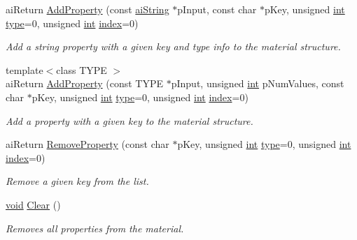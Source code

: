 \begin{DoxyCompactItemize}
ai\-Return \hyperlink{structai_material_a0432dbdfd97ffe71838daf967a6b087e}{Add\-Property} (const \hyperlink{structai_string}{ai\-String} $\ast$p\-Input, const char $\ast$p\-Key, unsigned \hyperlink{_s_d_l__thread_8h_a6a64f9be4433e4de6e2f2f548cf3c08e}{int} \hyperlink{_g_l_e_w_2glew_8h_a7d05960f4f1c1b11f3177dc963a45d86}{type}=0, unsigned \hyperlink{_s_d_l__thread_8h_a6a64f9be4433e4de6e2f2f548cf3c08e}{int} \hyperlink{_g_l_e_w_2glew_8h_a57f14e05b1900f16a2da82ade47d0c6d}{index}=0)
\begin{DoxyCompactList}\small\item\em Add a string property with a given key and type info to the material structure. \end{DoxyCompactList}\item 
{\footnotesize template$<$class T\-Y\-P\-E $>$ }\\ai\-Return \hyperlink{structai_material_a615a7af80f5d2b9f6f3ea66431017b4d}{Add\-Property} (const T\-Y\-P\-E $\ast$p\-Input, unsigned \hyperlink{_s_d_l__thread_8h_a6a64f9be4433e4de6e2f2f548cf3c08e}{int} p\-Num\-Values, const char $\ast$p\-Key, unsigned \hyperlink{_s_d_l__thread_8h_a6a64f9be4433e4de6e2f2f548cf3c08e}{int} \hyperlink{_g_l_e_w_2glew_8h_a7d05960f4f1c1b11f3177dc963a45d86}{type}=0, unsigned \hyperlink{_s_d_l__thread_8h_a6a64f9be4433e4de6e2f2f548cf3c08e}{int} \hyperlink{_g_l_e_w_2glew_8h_a57f14e05b1900f16a2da82ade47d0c6d}{index}=0)
\begin{DoxyCompactList}\small\item\em Add a property with a given key to the material structure. \end{DoxyCompactList}\item 
ai\-Return \hyperlink{structai_material_a21e18879d3e3c76a0a38791635667f5d}{Remove\-Property} (const char $\ast$p\-Key, unsigned \hyperlink{_s_d_l__thread_8h_a6a64f9be4433e4de6e2f2f548cf3c08e}{int} \hyperlink{_g_l_e_w_2glew_8h_a7d05960f4f1c1b11f3177dc963a45d86}{type}=0, unsigned \hyperlink{_s_d_l__thread_8h_a6a64f9be4433e4de6e2f2f548cf3c08e}{int} \hyperlink{_g_l_e_w_2glew_8h_a57f14e05b1900f16a2da82ade47d0c6d}{index}=0)
\begin{DoxyCompactList}\small\item\em Remove a given key from the list. \end{DoxyCompactList}\item 
\hyperlink{_s_d_l__opengl_8h_a3db05964a3cc4410f35b7ea2b7eb850d}{void} \hyperlink{structai_material_a9e66c8d6da65d5ef14b06876d93ba8ec}{Clear} ()
\begin{DoxyCompactList}\small\item\em Removes all properties from the material. \end{DoxyCompactList}\end{DoxyCompactItemize}
